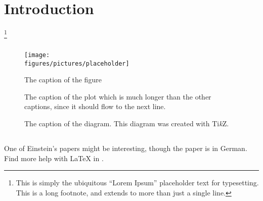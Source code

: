 \documentclass[\main/ExampleThesis]{subfiles}
\begin{document}
\chapter{Introduction}
\label{ch:introduction}

\lipsum[1]%
\footnote{This is simply the ubiquitous ``Lorem Ipsum'' placeholder text for typesetting. This is a long footnote, and extends to more than just a single line.}

\section{\lipsum[150][1-3]}

\lipsum[2]

\begin{figure}[tbp]
  \centering
  \texttt{[image: \\figures/pictures/placeholder]}
  \caption{The caption of the figure}
  \label{fig:placeholder1}
\end{figure}

\begin{figure}[tbp]
  \centering
  \caption{The caption of the plot which is much longer than the other captions, since it should flow to the next line.}
  \label{fig:placeholder2}
\end{figure}

\begin{figure}[tbp]
  \centering
  \caption{The caption of the diagram. This diagram was created with Ti\emph{k}Z.}
  \label{fig:placeholder3}
\end{figure}

\section{\lipsum[150][4]}

\subsection{\lipsum[150][8]}

\lipsum[3]

One of Einstein's papers \cite{einstein} might be interesting, though the paper is in German.
Find more help with \LaTeX{} in \cite{latexcompanion, knuthwebsite}.
\end{document}
